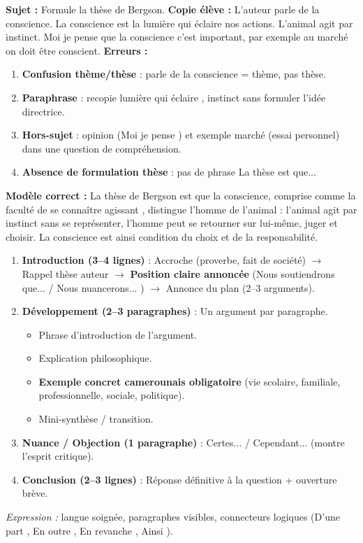 \documentclass[11pt]{article}
\newcounter{popsec}
\newcounter{popsub}
\newcommand{\courssub}[1]{%
  \stepcounter{popsub}%
  \par\vspace{9pt}\noindent{\popxbold\fontsize{11.5}{13}\selectfont\color{popink}{\color{poporange}\thepopsec.\thepopsub}\hspace{6pt}#1}\par\nopagebreak\vspace{4pt}
}
\begin{document}
\begin{exemplebox}
\textbf{Sujet :} \og Formule la thèse de Bergson. \fg
\textbf{Copie élève :} \og L'auteur parle de la conscience. La conscience est la lumière qui éclaire nos actions. L'animal agit par instinct. Moi je pense que la conscience c'est important, par exemple au marché on doit être conscient. \fg
\textbf{Erreurs :}
\begin{enumerate}
\item \textbf{Confusion thème/thèse} : \og parle de la conscience \fg = thème, pas thèse.
\item \textbf{Paraphrase} : recopie \og lumière qui éclaire \fg, \og instinct \fg sans formuler l'idée directrice.
\item \textbf{Hors-sujet} : opinion (\og Moi je pense \fg) et exemple marché (essai personnel) dans une question de compréhension.
\item \textbf{Absence de formulation thèse} : pas de phrase \og La thèse est que... \fg
\end{enumerate}
\textbf{Modèle correct :} \og La thèse de Bergson est que la conscience, comprise comme la faculté de \og se connaître agissant \fg, distingue l'homme de l'animal : l'animal agit par instinct sans se représenter, l'homme peut se retourner sur lui-même, juger et choisir. La conscience est ainsi condition du choix et de la responsabilité. \fg
\end{exemplebox}

\courssub{L'essai personnel}

\begin{methode}
\begin{enumerate}
\item \textbf{Introduction (3--4 lignes)} : Accroche (proverbe, fait de société) $\rightarrow$ Rappel thèse auteur $\rightarrow$ \textbf{Position claire annoncée} (\og Nous soutiendrons que... \fg / \og Nous nuancerons... \fg) $\rightarrow$ Annonce du plan (2--3 arguments).
\item \textbf{Développement (2--3 paragraphes)} : Un argument par paragraphe.
\begin{itemize}
\item Phrase d'introduction de l'argument.
\item Explication philosophique.
\item \textbf{Exemple concret camerounais obligatoire} (vie scolaire, familiale, professionnelle, sociale, politique).
\item Mini-synthèse / transition.
\end{itemize}
\item \textbf{Nuance / Objection (1 paragraphe)} : \og Certes... \fg / \og Cependant... \fg (montre l'esprit critique).
\item \textbf{Conclusion (2--3 lignes)} : Réponse définitive à la question + ouverture brève.
\end{enumerate}
\emph{Expression :} langue soignée, paragraphes visibles, connecteurs logiques (\og D'une part \fg, \og En outre \fg, \og En revanche \fg, \og Ainsi \fg).
\end{methode}
\end{document}
